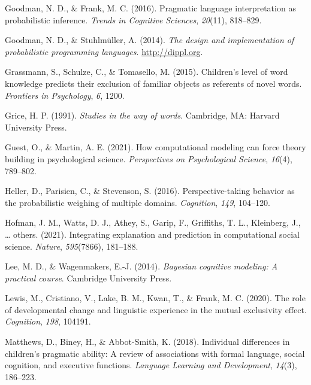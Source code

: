 \documentclass[
  man,floatsintext]{apa6}
\newlength{\cslhangindent}
\newlength{\cslentryspacingunit} %
\newenvironment{CSLReferences}[2] %
 {%
  \setlength{\parindent}{0pt}
  \ifodd #1
  \let\oldpar\par
  \def\par{\hangindent=\cslhangindent\oldpar}
  \fi
  \setlength{\parskip}{#2\cslentryspacingunit}
 }%
 {}
\begin{document}
\begin{CSLReferences}{1}{0}
\leavevmode{}%
Goodman, N. D., \& Frank, M. C. (2016). Pragmatic language interpretation as probabilistic inference. \emph{Trends in Cognitive Sciences}, \emph{20}(11), 818--829.

\leavevmode{}%
Goodman, N. D., \& Stuhlmüller, A. (2014). \emph{{The design and implementation of probabilistic programming languages}}. \url{http://dippl.org}.

\leavevmode{}%
Grassmann, S., Schulze, C., \& Tomasello, M. (2015). Children's level of word knowledge predicts their exclusion of familiar objects as referents of novel words. \emph{Frontiers in Psychology}, \emph{6}, 1200.

\leavevmode{}%
Grice, H. P. (1991). \emph{Studies in the way of words}. Cambridge, MA: Harvard University Press.

\leavevmode{}%
Guest, O., \& Martin, A. E. (2021). How computational modeling can force theory building in psychological science. \emph{Perspectives on Psychological Science}, \emph{16}(4), 789--802.

\leavevmode{}%
Heller, D., Parisien, C., \& Stevenson, S. (2016). Perspective-taking behavior as the probabilistic weighing of multiple domains. \emph{Cognition}, \emph{149}, 104--120.

\leavevmode{}%
Hofman, J. M., Watts, D. J., Athey, S., Garip, F., Griffiths, T. L., Kleinberg, J., \ldots{} others. (2021). Integrating explanation and prediction in computational social science. \emph{Nature}, \emph{595}(7866), 181--188.

\leavevmode{}%
Lee, M. D., \& Wagenmakers, E.-J. (2014). \emph{Bayesian cognitive modeling: A practical course}. Cambridge University Press.

\leavevmode{}%
Lewis, M., Cristiano, V., Lake, B. M., Kwan, T., \& Frank, M. C. (2020). The role of developmental change and linguistic experience in the mutual exclusivity effect. \emph{Cognition}, \emph{198}, 104191.

\leavevmode{}%
Matthews, D., Biney, H., \& Abbot-Smith, K. (2018). Individual differences in children's pragmatic ability: A review of associations with formal language, social cognition, and executive functions. \emph{Language Learning and Development}, \emph{14}(3), 186--223.


\end{CSLReferences}
\end{document}

